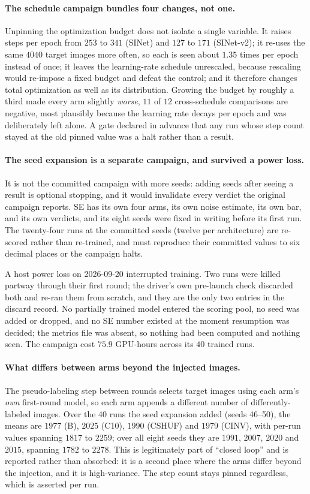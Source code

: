 \documentclass{article}
\begin{document}
\paragraph{The schedule campaign bundles four changes, not one.} Unpinning the optimization budget
does not isolate a single variable. It raises steps per epoch from $253$ to $341$ (SINet) and $127$
to $171$ (SINet-v2); it re-uses the same $4040$ target images more often, so each is seen about
$1.35$ times per epoch instead of once; it leaves the learning-rate schedule unrescaled, because
rescaling would re-impose a fixed budget and defeat the control; and it therefore changes total
optimization as well as its distribution. Growing the budget by roughly a third made every arm
slightly \emph{worse}, $11$ of $12$ cross-schedule comparisons are negative, most plausibly
because the learning rate decays per epoch and was deliberately left alone. A gate declared in
advance that any run whose step count stayed at the old pinned value was a halt rather than a
result.

\paragraph{The seed expansion is a separate campaign, and survived a power loss.} It is not the
committed campaign with more seeds: adding seeds after seeing a result is optional stopping, and it
would invalidate every verdict the original campaign reports. SE has its own four arms, its own
noise estimate, its own bar, and its own verdicts, and its eight seeds were fixed in writing before
its first run. The twenty-four runs at the committed seeds (twelve per architecture) are re-scored rather than re-trained, and must
reproduce their committed values to six decimal places or the campaign halts.

A host power loss on 2026-09-20 interrupted training. Two runs were killed partway through their
first round; the driver's own pre-launch check discarded both and re-ran them from scratch, and they
are the only two entries in the discard record. No partially trained model entered the scoring pool,
no seed was added or dropped, and no SE number existed at the moment resumption was decided; the
metrics file was absent, so nothing had been computed and nothing seen. The campaign cost $75.9$
GPU-hours across its $40$ trained runs.

\paragraph{What differs between arms beyond the injected images.} The pseudo-labeling step between
rounds selects target images using each arm's \emph{own} first-round model, so each arm appends a
different number of differently-labeled images. Over the 40 runs the seed expansion added (seeds 46--50), the means
are $1977$ (B), $2025$ (C10), $1990$ (CSHUF) and $1979$ (CINV), with per-run values spanning $1817$ to $2259$; over all
eight seeds they are $1991$, $2007$, $2020$ and $2015$, spanning $1782$ to $2278$. This
is legitimately part of ``closed loop'' and is reported rather than absorbed: it is a second place where the arms differ beyond the injection, and it is high-variance. The step count stays pinned
regardless, which is asserted per run.
\end{document}
